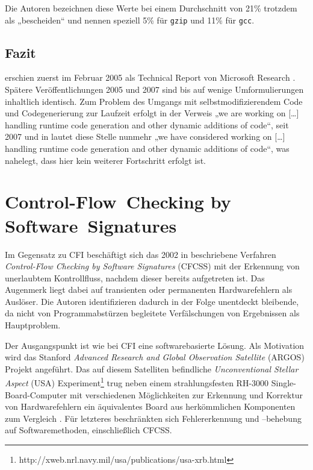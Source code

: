 \documentclass[11pt]{article}
\begin{document}
Die Autoren bezeichnen diese Werte bei einem Durchschnitt von 21\% trotzdem als
„bescheiden“ und nennen speziell 5\% für \texttt{gzip} und 11\% für
\texttt{gcc}.

\subsection{Fazit}

\cite{abadi-2009-control-tissec} erschien zuerst im Februar 2005 als Technical
Report von Microsoft Research \cite{abadi-2005-control-msr}. Spätere
Veröffentlichungen 2005 und 2007 sind bis auf wenige Umformulierungen
inhaltlich identisch. Zum Problem des Umgangs mit selbstmodifizierendem Code
und Codegenerierung zur Laufzeit erfolgt in \cite{abadi-2005-control-msr} der
Verweis „we are working on […] handling runtime code generation and other
dynamic additions of code“, seit 2007 und in \cite{abadi-2009-control-tissec}
lautet diese Stelle nunmehr „we have considered working on […] handling runtime
code generation and other dynamic additions of code“, was nahelegt, dass hier
kein weiterer Fortschritt erfolgt ist. %

\section{Control-Flow~Checking by Software~Signatures}


Im Gegensatz zu CFI beschäftigt sich das 2002 in \cite{oh-2002-control}
beschriebene Verfahren \emph{Control-Flow Checking by Software Signatures}
(CFCSS) mit der Erkennung von unerlaubtem Kontrollfluss, nachdem dieser bereits
aufgetreten ist. Das Augenmerk liegt dabei auf transienten oder permanenten
Hardwarefehlern als Auslöser. Die Autoren identifizieren dadurch in der Folge
unentdeckt bleibende, da nicht von Programmabstürzen begleitete Verfälschungen
von Ergebnissen als Hauptproblem.

Der Ausgangspunkt ist wie bei CFI eine softwarebasierte Lösung. Als Motivation
wird das Stanford \emph{Advanced Research and Global Observation Satellite}
(ARGOS) Projekt angeführt. Das auf diesem Satelliten befindliche
\emph{Unconventional Stellar Aspect} (USA)
Experiment\footnote{http://xweb.nrl.navy.mil/usa/publications/usa-xrb.html}
trug neben einem strahlungsfesten RH-3000 Single-Board-Computer mit
verschiedenen Möglichkeiten zur Erkennung und Korrektur von Hardwarefehlern ein
äquivalentes Board aus herkömmlichen Komponenten zum
Vergleich \cite{argos-2002-lessons}. Für letzteres beschränkten sich
Fehlererkennung und –behebung auf Softwaremethoden, einschließlich CFCSS.
\end{document}
